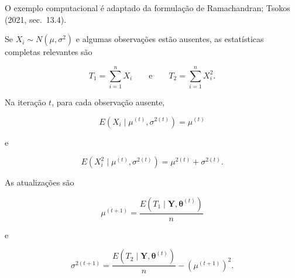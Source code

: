 \documentclass[
  letterpaper,
  DIV=11,
  numbers=noendperiod]{scrreprt}
\begin{document}
\begin{tcolorbox}[enhanced jigsaw, colback=white, leftrule=.75mm, colbacktitle=quarto-callout-tip-color!10!white, breakable, titlerule=0mm, bottomtitle=1mm, title=\textcolor{quarto-callout-tip-color}{\faLightbulb}\hspace{0.5em}{Exemplo 4 --- média e variância com observações ausentes}, colframe=quarto-callout-tip-color-frame, toprule=.15mm, opacityback=0, bottomrule=.15mm, opacitybacktitle=0.6, arc=.35mm, toptitle=1mm, rightrule=.15mm, coltitle=black, left=2mm]

O exemplo computacional é adaptado da formulação de Ramachandran; Tsokos
(2021, sec.~13.4).

\end{tcolorbox}

Se \(X_i\sim N(\mu,\sigma^2)\) e algumas observações estão ausentes, as
estatísticas completas relevantes são

\[T_1=\sum_{i=1}^nX_i
\qquad\text{e}\qquad
T_2=\sum_{i=1}^nX_i^2.\]

Na iteração \(t\), para cada observação ausente,

\[E(X_i\mid\mu^{(t)},\sigma^{2(t)})
=
\mu^{(t)}\]

e

\[E(X_i^2\mid\mu^{(t)},\sigma^{2(t)})
=
\mu^{2(t)}+\sigma^{2(t)}.\]

As atualizações são

\[\mu^{(t+1)}
=
\frac{E(T_1\mid\boldsymbol{Y},\boldsymbol{\theta}^{(t)})}{n}\]

e

\[\sigma^{2(t+1)}
=
\frac{E(T_2\mid\boldsymbol{Y},\boldsymbol{\theta}^{(t)})}{n}
-
\left(\mu^{(t+1)}\right)^2.\]
\end{document}
